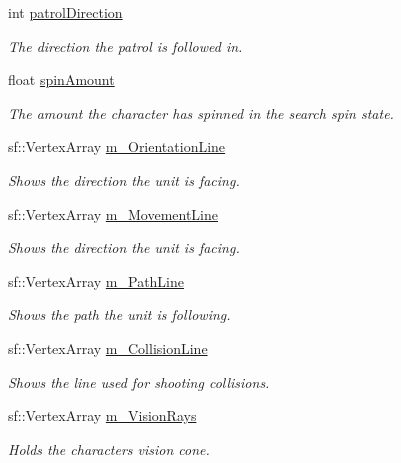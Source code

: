 \begin{DoxyCompactItemize}
int \hyperlink{class_character_a15115aab30dbd73eee49d3035a6bd94c}{patrol\+Direction}
\begin{DoxyCompactList}\small\item\em The direction the patrol is followed in. \end{DoxyCompactList}\item 
float \hyperlink{class_character_a0b30a626fb45ab6539d983ef51c19958}{spin\+Amount}
\begin{DoxyCompactList}\small\item\em The amount the character has spinned in the search spin state. \end{DoxyCompactList}\item 
sf\+::\+Vertex\+Array \hyperlink{class_character_a9444b4e76eb7cfebfb6f13b5c6af5535}{m\+\_\+\+Orientation\+Line}
\begin{DoxyCompactList}\small\item\em Shows the direction the unit is facing. \end{DoxyCompactList}\item 
sf\+::\+Vertex\+Array \hyperlink{class_character_aead9e4e92465865ad80eca79d222cddb}{m\+\_\+\+Movement\+Line}
\begin{DoxyCompactList}\small\item\em Shows the direction the unit is facing. \end{DoxyCompactList}\item 
sf\+::\+Vertex\+Array \hyperlink{class_character_af2a08c062ab2b12db31e36b15585e5ed}{m\+\_\+\+Path\+Line}
\begin{DoxyCompactList}\small\item\em Shows the path the unit is following. \end{DoxyCompactList}\item 
sf\+::\+Vertex\+Array \hyperlink{class_character_a0caf39910e976b37d664bf24cb620d12}{m\+\_\+\+Collision\+Line}
\begin{DoxyCompactList}\small\item\em Shows the line used for shooting collisions. \end{DoxyCompactList}\item 
sf\+::\+Vertex\+Array \hyperlink{class_character_a3ff2604a1ca7c2ebe4b07f378f4fc3fd}{m\+\_\+\+Vision\+Rays}
\begin{DoxyCompactList}\small\item\em Holds the character\textquotesingle{}s vision cone. \end{DoxyCompactList}\item 

\end{DoxyCompactItemize}

